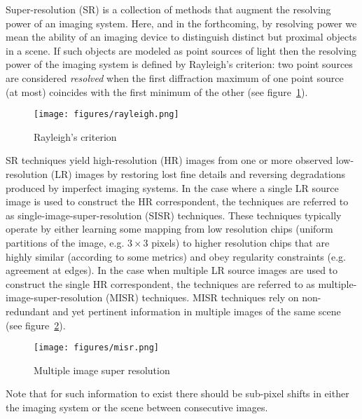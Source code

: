 Super-resolution (SR) is a collection of methods that augment the resolving power of an imaging system.
%
Here, and in the forthcoming, by resolving power we mean the ability of an imaging device to distinguish distinct but proximal objects in a scene.
%
If such objects are modeled as point sources of light then the resolving power of the imaging system is defined by Rayleigh's criterion: two point sources are considered \textit{resolved} when the first diffraction maximum of one point source (at most) coincides with the first minimum of the other (see figure~\ref{fig:rayleigh}).
\begin{figure}
    \center
    \texttt{[image: figures/rayleigh.png]}
    \caption{Rayleigh's criterion\cite{rayleigh}}
    \label{fig:rayleigh}
\end{figure}

SR techniques yield high-resolution (HR) images from one or more observed low-resolution (LR) images by restoring lost fine details and reversing degradations produced by imperfect imaging systems.
%
In the case where a single LR source image is used to construct the HR correspondent, the techniques are referred to as single-image-super-resolution (SISR) techniques.
%
These techniques typically operate by either learning some mapping from low resolution chips (uniform partitions of the image, e.g. $3\times 3$ pixels) to higher resolution chips that are highly similar (according to some metrics) and obey regularity constraints (e.g. agreement at edges).
%
In the case when multiple LR source images are used to construct the single HR correspondent, the techniques are referred to as multiple-image-super-resolution (MISR) techniques.
%
MISR techniques rely on non-redundant and yet pertinent information in multiple images of the same scene (see figure~\ref{fig:misr}).
\begin{figure}
    \texttt{[image: figures/misr.png]}
    \caption{Multiple image super resolution\cite{misr}}
    \label{fig:misr}
\end{figure}
%
Note that for such information to exist there should be sub-pixel shifts in either the imaging system or the scene between consecutive images.


